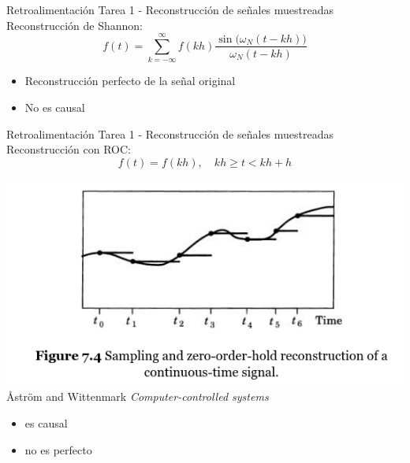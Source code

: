 \documentclass[presentation,aspectratio=1610]{beamer}
\begin{document}
\begin{frame}[label={sec:orgbc26f1f}]{Retroalimentación Tarea 1 - Reconstrucción de señales muestreadas}
Reconstrucción de Shannon:
\[ f(t) = \sum_{k=-\infty}^\infty f(kh) \frac{\sin\big(\omega_N(t-kh)\big)}{\omega_N(t-kh)}\]

\begin{itemize}
\item Reconstrucción perfecto de la señal original
\item \alert{No es causal}
\end{itemize}
\end{frame}

\begin{frame}[label={sec:orgfab2401}]{Retroalimentación Tarea 1 - Reconstrucción de señales muestreadas}
Reconstrucción con ROC:
\[ f(t) = f(kh), \quad kh \ge t < kh+h\]
\begin{center}
\includegraphics[width=0.6\linewidth]{../../figures/fig7-4.png}\\
{\tiny Åström and Wittenmark \emph{Computer-controlled systems}}
\end{center}

\begin{itemize}
\item \alert{es causal}
\item no es perfecto
\end{itemize}
\end{frame}
\end{document}
